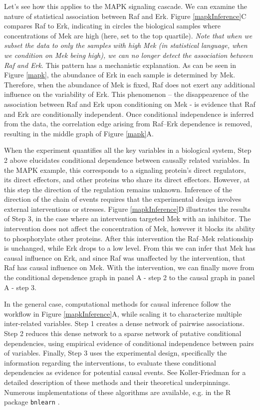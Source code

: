 \documentclass[journal=jacsat,manuscript=article]{achemso}
\begin{document}
Let's see how this applies to the MAPK signaling cascade. We can examine the nature of statistical association between Raf and Erk.  Figure \ref{mapkInference}C compares Raf to Erk, indicating in circles the biological samples where concentrations of Mek are high (here, set to the top quartile).  {\it Note that when we subset the data to only the samples with high Mek (in statistical language, when we condition on Mek being high), we can no longer detect the association between Raf and Erk}. This pattern has a mechanistic explanation. As can be seen in Figure \ref{mapk}, the abundance of Erk in each sample is determined by Mek. Therefore, when the abundance of Mek is fixed, Raf does not exert any additional influence on the variability of Erk.  This phenomenon -- the disappearence of the association between Raf and Erk upon conditioning on Mek - is evidence that  Raf and Erk are conditionally independent.  Once conditional independence is inferred from the data, the correlation edge arising from Raf--Erk dependence is removed, resulting in the middle graph of Figure \ref{mapk}A.

When the experiment quantifies all the key variables in a biological system, Step 2 above elucidates conditional dependence between causally related variables. In the MAPK example, this corresponds to a signaling protein's direct regulators, its direct effectors, and other proteins who share its direct effectors.  However, at this step the direction of the regulation remains unknown. Inference of the direction of the chain of events requires that the experimental design involves external interventions or stresses. Figure \ref{mapkInference}D illustrates the results of Step 3, in the case where an intervention targeted Mek with an inhibitor. The intervention does not affect the concentration of Mek, however it blocks its ability to phosphorylate other proteins.  After this intervention the Raf--Mek relationship is unchanged, while Erk drops to a low level.  From this we can infer that Mek has causal influence on Erk, and since Raf was unaffected by the intervention, that Raf has causal influence on Mek.  With the intervention, we can finally move from the conditional dependence graph in panel A - step 2 to the causal graph in panel A - step 3.

In the general case, computational methods for causal inference follow the workflow  in Figure \ref{mapkInference}A, while scaling it to characterize multiple inter-related variables. Step 1 creates a dense network of pairwise associations. Step 2 reduces this dense network to a sparse network of putative conditional dependencies, using empirical evidence of  conditional independence between pairs of variables. Finally, Step 3 uses the experimental design, specifically the information regarding the interventions, to evaluate these conditional dependencies as evidence for potential causal events.  See Koller-Friedman \cite{koller2009probabilistic} for a detailed description of these methods and their theoretical underpinnings. Numerous implementations of these algorithms are available, e.g. in the R package {\tt bnlearn} \cite{scutari2009learning}. 
\end{document}
